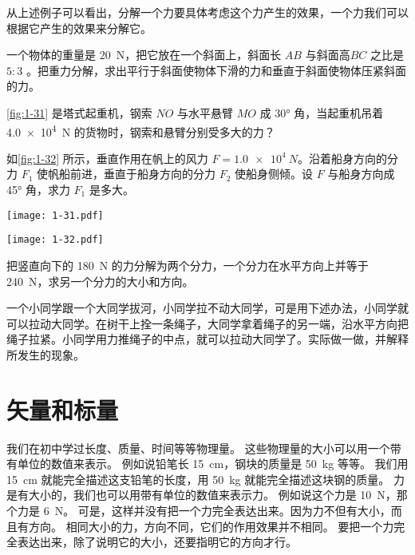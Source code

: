 从上述例子可以看出，分解一个力要具体考虑这个力产生的效果，一个力我们可以根据它产生的效果来分解它。

\begin{Practice}
\begin{question}
\item 一个物体的重量是 \qty{20}{N}，把它放在一个斜面上，斜面长 $AB$ 与斜面高$BC$ 之比是 $5:3$ 。把重力分解，求出平行于斜面使物体下滑的力和垂直于斜面使物体压紧斜面的力。
\item \cref{fig:1-31} 是塔式起重机，钢索 $NO$ 与水平悬臂 $MO$ 成 \ang{30} 角，当起重机吊着 \qty{4.0e4}{N} 的货物时，钢索和悬臂分别受多大的力？
\item 如\cref{fig:1-32} 所示，垂直作用在帆上的风力 $F=\qty{1.0e4}{N}$。沿着船身方向的分力 $F_1$ 使帆船前进，垂直于船身方向的分力 $F_2$ 使船身侧倾。设 $F$ 与船身方向成 \ang{45} 角，求力 $F_1$ 是多大。
\begin{figurehere}
  \begin{minipage}[b]{0.52\linewidth}\centering
    \texttt{[image: 1-31.pdf]}
    \caption{}\label{fig:1-31}
  \end{minipage}
  \begin{minipage}[b]{0.44\linewidth}\centering
    \texttt{[image: 1-32.pdf]}
    \caption{}\label{fig:1-32}
  \end{minipage}
\end{figurehere}
\item 把竖直向下的 \qty{180}{N} 的力分解为两个分力，一个分力在水平方向上并等于 \qty{240}{N}，求另一个分力的大小和方向。
\item 一个小同学跟一个大同学拔河，小同学拉不动大同学，可是用下述办法，小同学就可以拉动大同学。在树干上拴一条绳子，大同学拿着绳子的另一端，沿水平方向把绳子拉紧。小同学用力推绳子的中点，就可以拉动大同学了。实际做一做，并解释所发生的现象。
\end{question}
\end{Practice}

\section{矢量和标量}
我们在初中学过长度、质量、时间等等物理量。
这些物理量的大小可以用一个带有单位的数值来表示。
例如说铅笔长 \qty{15}{cm}，钢块的质量是 \qty{50}{kg} 等等。
我们用 \qty{15}{cm} 就能完全描述这支铅笔的长度，用 \qty{50}{kg} 就能完全描述这块钢的质量。
力是有大小的，我们也可以用带有单位的数值来表示力。
例如说这个力是 \qty{10}{N}，那个力是 \qty{6}{N}。
可是，这样并没有把一个力完全表达出来。因为力不但有大小，而且有方向。
相同大小的力，方向不同，它们的作用效果并不相同。
要把一个力完全表达出来，除了说明它的大小，还要指明它的方向才行。

